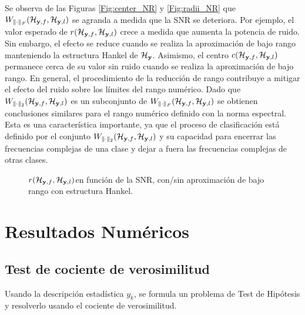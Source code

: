 		Se observa de las Figuras  \eqref{Fig:center_NR} y \eqref{Fig:radii_NR} que $W_{\|\cdot\|_F}(\mathcal{H}_{\mathbf{y},f},\mathcal{H}_{\mathbf{y},l})$ se agranda a medida que la SNR se deteriora. Por ejemplo, el valor esperado de $r(\mathcal{H}_{\mathbf{y},f},\mathcal{H}_{\mathbf{y},l})$ crece a medida que aumenta la potencia de ruido. Sin embargo, el efecto se reduce cuando se realiza la aproximación de bajo rango manteniendo la estructura Hankel de $\mathcal{H}_{\mathbf{y}}$. Asimismo, el centro $c(\mathcal{H}_{\mathbf{y},f},\mathcal{H}_{\mathbf{y},l})$ permanece cerca de su valor sin ruido cuando se realiza la aproximación de bajo rango. En general, el procedimiento de la reducción de rango contribuye a mitigar el efecto del ruido sobre los límites del rango numérico. Dado que $W_{\|\cdot\|_2}(\mathcal{H}_{\mathbf{y},f},\mathcal{H}_{\mathbf{y},l})$ es un subconjunto de $W_{\|\cdot\|_F}(\mathcal{H}_{\mathbf{y},f},\mathcal{H}_{\mathbf{y},l})$ se obtienen conclusiones similares para el rango numérico definido con la norma espectral. Esta es una característica importante, ya que el proceso de clasificación está definido por el conjunto $W_{\|\cdot\|_2}(\mathcal{H}_{\mathbf{y},f},\mathcal{H}_{\mathbf{y},l})$ y su capacidad para encerrar las frecuencias complejas de una clase y dejar a fuera las frecuencias complejas de otras clases.
		\begin{figure}[ht]
			\centering
			\resizebox{0.5\linewidth}{!}{}
			\caption{$r(\mathcal{H}_{\mathbf{y},f},\mathcal{H}_{\mathbf{y},l})$en función de la SNR, con/sin aproximación de bajo rango con estructura Hankel.}
			\label{Fig:radii_NR}
		\end{figure}
			
	\section{Resultados Numéricos}
		\subsection{Test de cociente de verosimilitud}
		
			Usando la descripción estadística $y_k$, se formula un problema de Test de Hipótesis y resolverlo usando el cociente de verosimilitud. 
			
